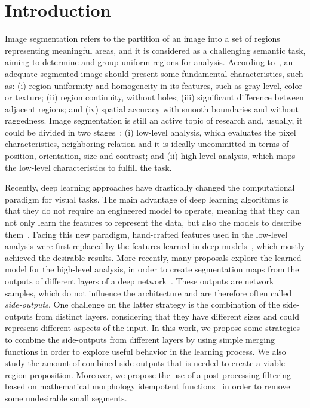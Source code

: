\section{Introduction}
\label{sec:intro}

Image segmentation refers to the partition of an image into a set of regions representing  meaningful areas, and it is considered as a challenging semantic task, aiming to determine and group uniform regions for analysis. According to~\cite{DOMINGUEZ}, an adequate segmented image should present some fundamental characteristics, such as: (i) region uniformity and homogeneity in  its features, such as gray level, color or texture; (ii) region continuity, without holes; (iii) significant difference between adjacent regions; and (iv) spatial accuracy with smooth boundaries and without raggedness. Image segmentation is still an active topic of research and, usually, it could be divided in two stages~\cite{guigues06}: (i) low-level analysis, which evaluates the pixel characteristics, neighboring relation and it is ideally uncommitted in terms of position, orientation, size and contrast; and (ii) high-level analysis, which maps the low-level characteristics to fulfill the task.  

Recently, deep learning approaches have drastically changed the computational paradigm for visual tasks. The main advantage of deep learning algorithms is that they do not require an engineered model to operate, meaning that they can not only learn the features to represent the data, but also the models to describe them~\cite{goodfellow16}. Facing this new paradigm, hand-crafted features used in the low-level analysis were first replaced by the features learned in deep models~\cite{farabet2013,simonyan2014,lee2015}, which mostly achieved the desirable results. More recently, many proposals explore the learned model for the high-level analysis, in order to create segmentation maps from the outputs of different layers of a deep network~\cite{xie2017,cheng2016,maninis2017,liu2017}. 
These outputs are network samples, which do not influence the architecture and are therefore often called \textit{side-outputs}. 
One challenge on the latter strategy is the combination of the side-outputs from distinct layers, considering that they have different sizes and could represent different aspects of the input.  In this work, we propose some strategies to combine the side-outputs from different layers by using simple merging functions in order to explore useful behavior in the learning process. We also study the amount of combined side-outputs that is needed to create a viable region proposition. Moreover, we propose the use of a post-processing filtering based on mathematical morphology idempotent functions~\cite{najman13} in order to remove some undesirable small segments.


